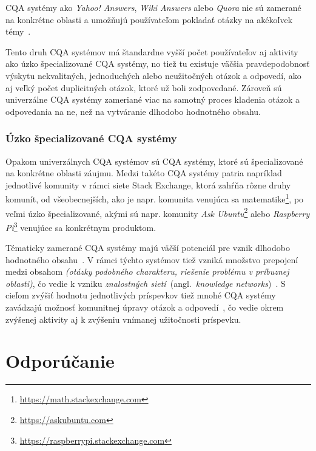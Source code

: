 CQA systémy ako \emph{Yahoo! Answers}, \emph{Wiki Answers} alebo \emph{Quora} nie sú zamerané na konkrétne oblasti
a umožňujú používateľom pokladať otázky na akékoľvek témy~\cite{Chua2014}.

Tento druh CQA systémov má štandardne vyšší počet používateľov aj aktivity ako úzko špecializované CQA systémy,
no tiež tu existuje väčšia pravdepodobnosť výskytu nekvalitných, jednoduchých alebo neužitočných otázok a odpovedí,
ako aj veľký počet duplicitných otázok, ktoré už boli zodpovedané. Zároveň sú univerzálne CQA systémy zameriané viac
na samotný proces kladenia otázok a odpovedania na ne, než na vytváranie dlhodobo hodnotného obsahu.

\subsection{Úzko špecializované CQA systémy}

Opakom univerzálnych CQA systémov sú CQA systémy, ktoré sú špecializované na konkrétne oblasti záujmu.
Medzi takéto CQA systémy patria napríklad jednotlivé komunity v rámci siete Stack Exchange, ktorá zahŕňa rôzne druhy
komunít, od všeobecnejších, ako je napr. komunita venujúca sa matematike\footnote{\url{https://math.stackexchange.com}},
po veľmi úzko špecializované, akými sú napr. komunity \emph{Ask Ubuntu}\footnote{\url{https://askubuntu.com}} alebo
\emph{Raspberry Pi}\footnote{\url{https://raspberrypi.stackexchange.com}} venujúce sa konkrétnym produktom.

Tématicky zamerané CQA systémy majú väčší potenciál pre vznik dlhodobo hodnotného obsahu~\cite{Anderson2012}. V rámci
týchto systémov tiež vzniká množstvo prepojení medzi obsahom \textit{(otázky podobného charakteru, riešenie problému
v príbuznej oblasti)}, čo vedie k vzniku \emph{znalostných sietí}~(angl.~\emph{knowledge networks})~\cite{Li2016}.
S cieľom zvýšiť hodnotu jednotlivých príspevkov tiež mnohé CQA systémy zavádzajú možnosť komunitnej úpravy
otázok a odpovedí~\cite{Li2015}, čo vedie okrem zvýšenej aktivity aj k zvýšeniu vnímanej užitočnosti príspevku.





\chapter{Odporúčanie}

